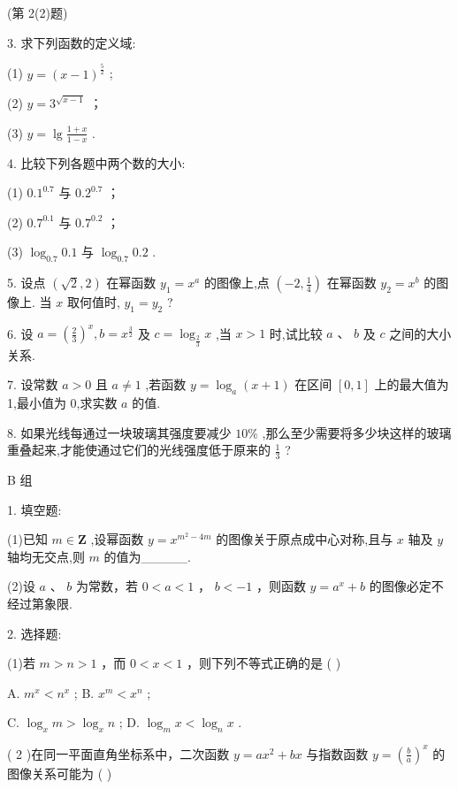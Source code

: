 \documentclass[10pt]{article}
\begin{document}
(第 2(2)题)

3. 求下列函数的定义域:

(1) \(y = {\left( x - 1\right) }^{\frac{5}{2}}\) ;

(2) \(y = {3}^{\sqrt{x - 1}}\) ；

(3) \(y = \lg \frac{1 + x}{1 - x}\) .

4. 比较下列各题中两个数的大小:

(1) \({0.1}^{0.7}\) 与 \({0.2}^{0.7}\) ；

(2) \({0.7}^{0.1}\) 与 \({0.7}^{0.2}\) ；

(3) \({\log }_{0.7}{0.1}\) 与 \({\log }_{0.7}{0.2}\) .

5. 设点 \(\left( {\sqrt{2},2}\right)\) 在幂函数 \({y}_{1} = {x}^{a}\) 的图像上,点 \(\left( {-2,\frac{1}{4}}\right)\) 在幂函数 \({y}_{2} = {x}^{b}\) 的图像上. 当 \(x\) 取何值时, \({y}_{1} = {y}_{2}\) ?

6. 设 \(a = {\left( \frac{2}{3}\right) }^{x},b = {x}^{\frac{3}{2}}\) 及 \(c = {\log }_{\frac{2}{3}}x\) ,当 \(x > 1\) 时,试比较 \(a\text{ 、 }b\) 及 \(c\) 之间的大小关系.

7. 设常数 \(a > 0\) 且 \(a \neq  1\) ,若函数 \(y = {\log }_{a}\left( {x + 1}\right)\) 在区间 \(\left\lbrack  {0,1}\right\rbrack\) 上的最大值为 1,最小值为 0,求实数 \(a\) 的值.

8. 如果光线每通过一块玻璃其强度要减少 \({10}\%\) ,那么至少需要将多少块这样的玻璃重叠起来,才能使通过它们的光线强度低于原来的 \(\frac{1}{3}\) ?





B 组

1. 填空题:

(1)已知 \(m \in  \mathbf{Z}\) ,设幂函数 \(y = {x}^{{m}^{2} - {4m}}\) 的图像关于原点成中心对称,且与 \(x\) 轴及 \(y\) 轴均无交点,则 \(m\) 的值为\_\_\_\_\_.

(2)设 \(a\) 、 \(b\) 为常数，若 \(0 < a < 1\) ， \(b <  - 1\) ，则函数 \(y = {a}^{x} + b\) 的图像必定不经过第象限.

2. 选择题:

(1)若 \(m > n > 1\) ，而 \(0 < x < 1\) ，则下列不等式正确的是 ( )

A. \({m}^{x} < {n}^{x}\) ; B. \({x}^{m} < {x}^{n}\) ;

C. \({\log }_{x}m > {\log }_{x}n\) ; D. \({\log }_{m}x < {\log }_{n}x\) .

( 2 )在同一平面直角坐标系中，二次函数 \(y = a{x}^{2} + {bx}\) 与指数函数 \(y = {\left( \frac{b}{a}\right) }^{x}\) 的图像关系可能为 ( )
\end{document}
